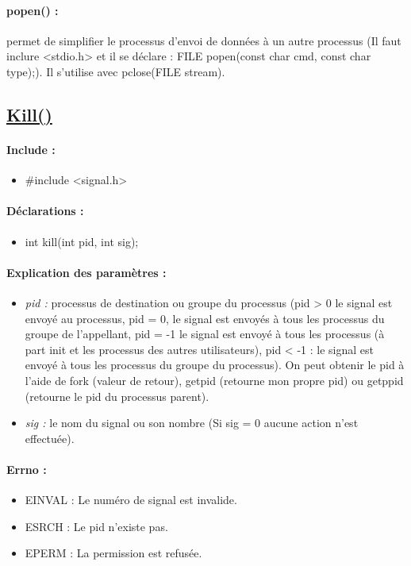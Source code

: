 \documentclass{article}[12pt]
\begin{document}
\paragraph{popen() : } permet de simplifier le processus d'envoi de données à un autre processus (Il faut inclure <stdio.h> et il se déclare : FILE \* popen(const char \* cmd, const char \* type);). Il s'utilise avec pclose(FILE \* stream). 
\subsection{\href{http://jp.barralis.com/linux-man/man2/kill.2.php}{Kill()}}
\paragraph{Include : }
\begin{itemize}
	\item \#include <signal.h>
\end{itemize}
\paragraph{Déclarations : }
\begin{itemize}
	\item int kill(int pid, int sig);
\end{itemize}
\paragraph{Explication des paramètres : }
\begin{itemize}
	\item \emph{pid : } processus de destination ou groupe du processus (pid > 0 le signal est envoyé au processus, pid = 0, le signal est envoyés à tous les processus du groupe de l'appellant, pid = -1 le signal est envoyé à tous les processus (à part init et les processus des autres utilisateurs), pid < -1 : le signal est envoyé à tous les processus du groupe du processus). On peut obtenir le pid à l'aide de fork (valeur de retour), getpid (retourne mon propre pid) ou getppid (retourne le pid du processus parent).
	\item \emph{sig : } le nom du signal ou son nombre (Si sig = 0 aucune action n'est effectuée). 
\end{itemize}
\paragraph{Errno :}
\begin{itemize}
	\item EINVAL : Le numéro de signal est invalide.
    \item ESRCH : Le pid n'existe pas.
    \item EPERM : La permission est refusée.
\end{itemize}
\end{document}
